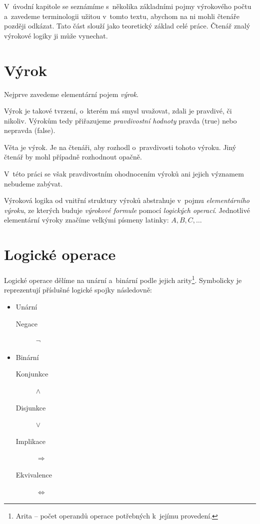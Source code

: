 \documentclass[thesis=B,czech,hidelinks]{thesis}[2012/06/26]
\begin{document}
V~úvodní kapitole se seznámíme s~několika základními pojmy výrokového počtu a~zavedeme terminologii užitou v~tomto textu, abychom na ni mohli čtenáře později odkázat. Tato část slouží jako teoretický základ celé práce. Čtenář znalý výrokové logiky ji může vynechat.

\section{Výrok}

Nejprve zavedeme elementární pojem \emph{výrok}.

Výrok je takové tvrzení, o~kterém má smysl uvažovat, zdali je pravdivé, či nikoliv. Výrokům tedy přiřazujeme \emph{pravdivostní hodnoty} pravda (true) nebo nepravda (false)\cite{sochor}.

\begin{exm}
Věta  je výrok. Je na čtenáři, aby rozhodl o~pravdivosti tohoto výroku. Jiný čtenář by mohl případně rozhodnout opačně.
\end{exm}
 
V~této práci se však pravdivostním ohodnocením výroků ani jejich významem nebudeme zabývat.

Výroková logika od vnitřní struktury výroků abstrahuje v~pojmu \emph{elementárního výroku}, ze kterých buduje \emph{výrokové formule} pomocí \emph{logických operací}. Jednotlivé elementární výroky značíme velkými písmeny latinky: $A, B, C, \ldots$

\section{Logické operace}

Logické operace dělíme na unární a~binární podle jejich arity\footnote{Arita -- počet operandů operace potřebných k~jejímu provedení.}. Symbolicky je reprezentují příslušné logické spojky následovně:

\begin{itemize}
	\item Unární
	\begin{description}
		\item[Negace] $\neg$
	\end{description}
	\item Binární
	\begin{description}
		\item[Konjunkce] $\wedge$
		\item[Disjunkce] $\vee$
		\item[Implikace] $\Rightarrow$
		\item[Ekvivalence] $\Leftrightarrow$
	\end{description}
\end{itemize}
\end{document}
